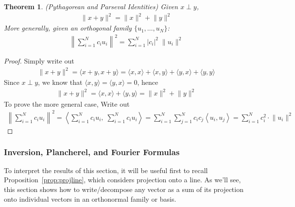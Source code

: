 \documentclass[12pt]{book}
\numberwithin{equation}{section} %
\theoremstyle{plain}
\newtheorem{thm}{Theorem}[section]
\theoremstyle{definition}
\theoremstyle{remark}
\begin{document}
\begin{thm}
\label{pythag}
\emph{(Pythagorean and Parseval Identities)} Given $x\perp y$,
\begin{align*}
    \lVert x + y\rVert^2 = \lVert x\rVert^2 + \lVert y \rVert^2
\end{align*}
More generally, given an orthogonal family $\{u_1,\ldots,u_N\}$:
\begin{align*}
  \left\lVert \sum_{i=1}^N c_i u_i \right\rVert^2
  = \sum_{i=1}^N |c_i|^2\;\lVert u_i\rVert^2
\end{align*}
\end{thm}
\begin{proof}
Simply write out
\begin{align*}
  \lVert x + y\rVert^2 =
  \langle x + y, x + y\rangle
  =
  \langle x , x \rangle
  +
  \langle x , y \rangle
  +
  \langle y , x \rangle
  +
  \langle y , y \rangle
\end{align*}
Since $x\perp y$, we know that $\langle x,y \rangle = \langle y,x
\rangle =0$, hence
\begin{align*}
  \lVert x + y\rVert^2 =
  \langle x , x \rangle
  +
  \langle y , y \rangle
  =
  \lVert x\rVert^2 + \lVert y\rVert^2
\end{align*}
To prove the more general case, Write out
\begin{align*}
  \left\lVert \sum_{i=1}^N c_i u_i \right\rVert^2
  =
  \left\langle
  \sum_{i=1}^N c_i u_i,\;
  \sum_{i=1}^N c_i u_i
  \right\rangle
  =
  \sum_{i=1}^N
  \sum_{j=1}^N
  c_ic_j
  \left\langle
  u_i, u_j
  \right\rangle
  =
  \sum_{i=1}^N
  c_i^2
  \cdot
  \lVert u_i\rVert^2
\end{align*}
\end{proof}


\clearpage
\subsubsection{Inversion, Plancherel, and Fourier Formulas}

To interpret the results of this section, it will be useful first to
recall Proposition~\ref{prop:projline}, which considers projection onto
a line.
As we'll see, this section shows how to write/decompose any vector as a
sum of its projection onto individual vectors in an orthonormal family
or basis.
\end{document}
